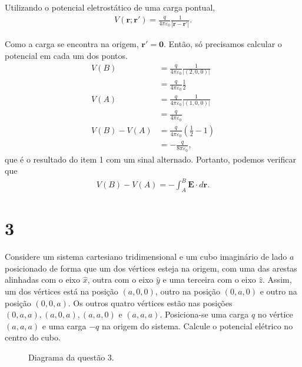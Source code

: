 \documentclass[11pt]{article}
\begin{document}
Utilizando o potencial eletrostático de uma carga pontual,
\begin{align}
  V(\mathbf r; \mathbf r') = \frac q{4\pi\varepsilon_0}\frac 1{|\mathbf r-\mathbf r'|}.
\end{align}

Como a carga se encontra na origem, \(\mathbf r' = \mathbf 0\). Então, só
precisamos calcular o potencial em cada um dos pontos.
\begin{align}
  V(B) &= \frac q{4\pi\varepsilon_0}\frac 1{|(2,0,0)|}\\
       &= \frac q{4\pi\varepsilon_0}\frac 1{2}\\
  V(A) &= \frac q{4\pi\varepsilon_0}\frac 1{|(1,0,0)|}\\
       &= \frac q{4\pi\varepsilon_0}\\
  V(B) - V(A) &= \frac q{4\pi\varepsilon_0}\left(\frac12 -1 \right)\\
              &= -\frac q{8\pi\varepsilon_0},
\end{align}
que é o resultado do item 1 com um sinal alternado. Portanto, podemos
verificar que 
\begin{align}
  V(B) - V(A) = -\int_A^B \mathbf E\cdot d\mathbf r.
\end{align}
\section{3}
\label{sec:org82e8994}
Considere um sistema cartesiano tridimensional e um cubo imaginário de
lado \(a\) posicionado de forma que um dos vértices esteja na origem, com
uma das arestas alinhadas com o eixo \(\hat x\), outra com o eixo \(\hat y\)
e uma terceira com o eixo \(\hat z\). Assim, um dos vértices está na
posição \((a,0,0)\), outro na posição \((0,a,0)\) e outro na posição
\((0,0,a)\). Os outros quatro vértices estão nas posições
\((0,a,a), (a,0,a), (a,a,0)\) e \((a,a,a)\). Posiciona-se uma carga \(q\) no
vértice \((a,a,a)\) e uma carga \(-q\) na origem do sistema. Calcule o
potencial elétrico no centro do cubo. 

\begin{figure}[h!]
  \centering
  \caption{Diagrama da questão 3.}
  \label{fig:ex-3}
\end{figure}
\end{document}
